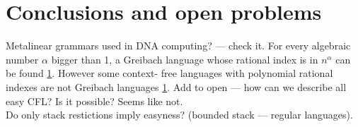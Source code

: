 \documentclass[smallextended]{svjour3}       %
\begin{document}





\section{Conclusions and open problems}
Metalinear grammars used in DNA computing? --- check it.
For every algebraic number $\alpha$ bigger than 1, a Greibach language whose rational index is in $n^\alpha$ can be found \ref{}. However some context-
free languages with polynomial rational indexes are not Greibach languages \ref{}.
Add to open --- how can we describe all easy CFL? Is it possible?  Seems like not. 
\\Do only stack restictions imply easyness? (bounded stack --- regular languages).




%
%



%
%
\end{document}
